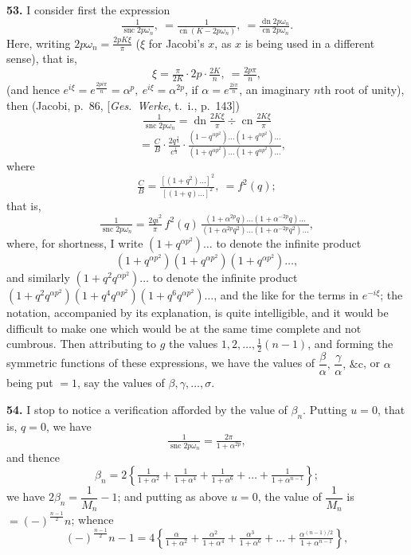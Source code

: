 \documentclass[11pt]{article}
\begin{document}
\noindent\textbf{53.} I consider first the expression
\[
\tfrac{1}{\operatorname{snc}2p\omega_n},\ =\tfrac{1}{\operatorname{cn}(K-2p\omega_n)},\ =\tfrac{\operatorname{dn}2p\omega_n}{\operatorname{cn}2p\omega_n}.
\]
Here, writing $2p\omega_n=\tfrac{2pK\xi}{\pi}$ ($\xi$ for Jacobi's $x$, as $x$ is being used in a different sense), that is,
\[
\xi=\tfrac{\pi}{2K}\cdot 2p\cdot\tfrac{2K}{n},\ =\tfrac{2p\pi}{n},
\]
(and hence $e^{i\xi}=e^{\frac{2pi\pi}{n}}=\alpha^p,\ e^{i\xi}=\alpha^{2p}$, if $\alpha=e^{\frac{2i\pi}{n}}$, an imaginary $n$th root of unity), then
(Jacobi, p.~86, [\textit{Ges.\ Werke}, t.~i., p.~143])
\[
\tfrac{1}{\operatorname{snc}2p\omega_n}=\operatorname{dn}\!\tfrac{2K\xi}{\pi}\div\operatorname{cn}\!\tfrac{2K\xi}{\pi}
\]
\[
\quad=\tfrac{C}{B}\cdot\tfrac{2q^{\frac{1}{4}}}{c^{\frac{1}{4}}}\cdot\tfrac{(1-q^{\alpha p^2})\ldots(1+q^{\alpha p^2})\ldots}{(1+q^{\alpha p^2})\ldots(1+q^{\alpha p^2})\ldots},
\]
where
\[
\tfrac{C}{B}=\tfrac{[(1+q^2)\ldots]^2}{[(1+q)\ldots]^2},\ =f^2(q);
\]
that is,
\[
\tfrac{1}{\operatorname{snc}2p\omega_n}=\tfrac{2qi^2}{\pi}\,f^2(q)\,\tfrac{(1+\alpha^{2p}q)\ldots(1+\alpha^{-2p}q)\ldots}{(1+\alpha^{2p}q^2)\ldots(1+\alpha^{-2p}q^2)\ldots},
\]
where, for shortness, I write $(1+q^{\alpha p^2})\ldots$ to denote the infinite product
\[
(1+q^{\alpha p^2})(1+q^{\alpha p^2})(1+q^{\alpha p^2})\ldots,
\]
and similarly $(1+q^2q^{\alpha p^2})\ldots$ to denote the infinite product
$(1+q^2q^{\alpha p^2})(1+q^4q^{\alpha p^2})(1+q^6q^{\alpha p^2})\ldots$,
and the like for the terms in $e^{-i\xi}$; the notation, accompanied by its explanation, is
quite intelligible, and it would be difficult to make one which would be at the same
time complete and not cumbrous. Then attributing to $g$ the values $1, 2, \ldots, \tfrac{1}{2}(n-1)$,
and forming the symmetric functions of these expressions, we have the values of $\dfrac{\beta}{\alpha},\,\dfrac{\gamma}{\alpha},\,\&\text{c}$,
or $\alpha$ being put $=1$, say the values of $\beta,\gamma,\ldots,\sigma$.

\medskip
\noindent\textbf{54.} I stop to notice a verification afforded by the value of $\beta_n$. Putting $u=0$,
that is, $q=0$, we have
\[
\tfrac{1}{\operatorname{snc}2p\omega_n}=\tfrac{2\pi}{1+\alpha^{2p}},
\]
and thence
\[
\beta_n=2\!\left\{\tfrac{1}{1+\alpha^2}+\tfrac{1}{1+\alpha^4}+\tfrac{1}{1+\alpha^6}+\ldots+\tfrac{1}{1+\alpha^{n-1}}\right\}\!;
\]
we have $2\beta_n=\dfrac{1}{M_n}-1$; and putting as above $u=0$, the value of $\dfrac{1}{M_n}$ is $=(-)^{\frac{n-1}{2}}n$; whence
\[
(-)^{\frac{n-1}{2}}n-1=4\!\left\{\tfrac{\alpha}{1+\alpha^2}+\tfrac{\alpha^2}{1+\alpha^4}+\tfrac{\alpha^3}{1+\alpha^6}+\ldots+\tfrac{\alpha^{(n-1)/2}}{1+\alpha^{n-1}}\right\}\!,
\]
\end{document}
